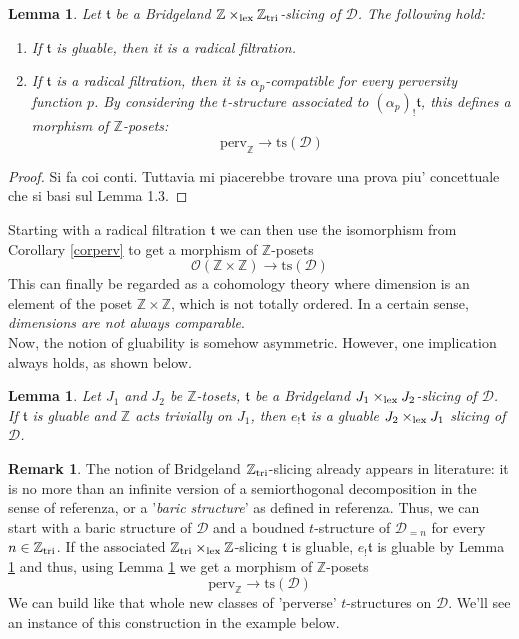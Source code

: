 \documentclass{article}
\newtheorem{lem}[thm]{Lemma}
\theoremstyle{definition}
\newtheorem{rem}[thm]{Remark}
\newcommand{\Z}{\mathbb{Z}}
\newcommand{\Oo}{\mathcal{O}}
\newcommand{\ts}{\mathrm{ts}}
\newcommand{\tee}{\mathfrak{t}}
\newcommand{\lex}{\times_{\textnormal{lex}}}
\newcommand{\triv}{\mathbb{Z}_{\textnormal{tri}}}
\begin{document}
\begin{lem}\label{incolla1}
  Let $\tee$ be a  Bridgeland $\Z \lex \triv$-slicing of $\mathscr{D}$. The following hold: 
  \begin{enumerate}
   \item If $\tee$ is gluable, then it is a radical filtration.  
   \item If $\tee$ is a radical filtration, then it is $\alpha_p$-compatible for every perversity function $p$. By considering the $t$-structure associated to $(\alpha_p)_!\tee$, this defines a morphism of $\mathbb{Z}$-posets:
     \[
     \mathrm{perv}_\Z \to \ts(\mathscr{D})
     \]
    \end{enumerate}
\end{lem}

\begin{proof}
{\color{red} Si fa coi conti. Tuttavia mi piacerebbe trovare una prova piu' concettuale che si basi sul Lemma 1.3.}
\end{proof}

Starting with a radical filtration $\tee$ we can then use the isomorphism from Corollary \ref{corperv} to get a morphism of $\Z$-posets
\[
 \Oo(\Z \times \Z) \rightarrow \ts(\mathscr{D}) 
 \]
 This can finally be regarded as a cohomology theory where dimension is an element of the poset $\Z \times \Z$, which is not totally ordered. In a certain sense, \textit{dimensions are not always comparable}. \\
 
Now, the notion of gluability is somehow asymmetric. However, one implication always holds, as shown below.

\begin{lem}\label{incolla2}
Let $J_1$  and $J_2$ be $\Z$-tosets, $\tee$ be a Bridgeland $J_1 \lex J_2$-slicing of $\mathscr{D}$. If $\tee$ is gluable and $\Z$ acts trivially on $J_1$, then $e_! \tee$ is a gluable $J_2 \lex J_1$ slicing of $\mathscr{D}$. 
\end{lem}

\begin{rem}\label{incollarem}
  The notion of Bridgeland $\triv$-slicing already appears in literature: it is no more than an infinite version of a semiorthogonal decomposition in the sense of {\color{red} referenza}, or a '\textit{baric structure}' as defined in {\color{red} referenza}. Thus, we can start with a baric structure of $\mathscr{D}$ and a boudned $t$-structure of $\mathscr{D}_{= n}$ for every $n \in \triv$. If the associated $\triv \lex \Z$-slicing $\tee$ is gluable, $e_!\tee$ is gluable by Lemma \ref{incolla2} and thus, using Lemma \ref{incolla2} we get a morphism of $\Z$-posets
  \[
  \mathrm{perv}_\Z \rightarrow \ts(\mathscr{D})
  \]
  We can build like that whole new classes of 'perverse' $t$-structures on $\mathscr{D}$. We'll see an instance of this construction in the example below. 
\end{rem}
  
\end{document}
